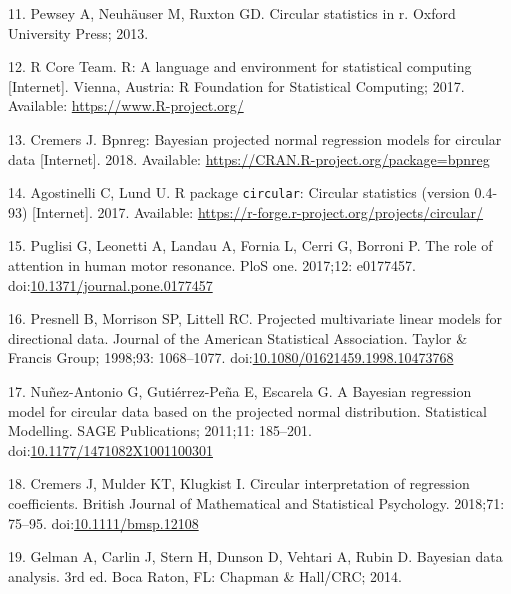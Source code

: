 \documentclass[11pt,]{article}
\begin{document}
\leavevmode\hypertarget{ref-pewsey2013circular}{}%
11. Pewsey A, Neuhäuser M, Ruxton GD. Circular statistics in r. Oxford
University Press; 2013.

\leavevmode\hypertarget{ref-team2017r}{}%
12. R Core Team. R: A language and environment for statistical computing
{[}Internet{]}. Vienna, Austria: R Foundation for Statistical Computing;
2017. Available: \url{https://www.R-project.org/}

\leavevmode\hypertarget{ref-bpnreg2018}{}%
13. Cremers J. Bpnreg: Bayesian projected normal regression models for
circular data {[}Internet{]}. 2018. Available:
\url{https://CRAN.R-project.org/package=bpnreg}

\leavevmode\hypertarget{ref-circularpackage}{}%
14. Agostinelli C, Lund U. R package \texttt{circular}: Circular
statistics (version 0.4-93) {[}Internet{]}. 2017. Available:
\url{https://r-forge.r-project.org/projects/circular/}

\leavevmode\hypertarget{ref-puglisi2017role}{}%
15. Puglisi G, Leonetti A, Landau A, Fornia L, Cerri G, Borroni P. The
role of attention in human motor resonance. PloS one. 2017;12: e0177457.
doi:\href{https://doi.org/10.1371/journal.pone.0177457}{10.1371/journal.pone.0177457}

\leavevmode\hypertarget{ref-presnell1998projected}{}%
16. Presnell B, Morrison SP, Littell RC. Projected multivariate linear
models for directional data. Journal of the American Statistical
Association. Taylor \& Francis Group; 1998;93: 1068--1077.
doi:\href{https://doi.org/10.1080/01621459.1998.10473768}{10.1080/01621459.1998.10473768}

\leavevmode\hypertarget{ref-nunez2011bayesian}{}%
17. Nuñez-Antonio G, Gutiérrez-Peña E, Escarela G. A Bayesian regression
model for circular data based on the projected normal distribution.
Statistical Modelling. SAGE Publications; 2011;11: 185--201.
doi:\href{https://doi.org/10.1177/1471082X1001100301}{10.1177/1471082X1001100301}

\leavevmode\hypertarget{ref-CremersMulderKlugkist2017}{}%
18. Cremers J, Mulder KT, Klugkist I. Circular interpretation of
regression coefficients. British Journal of Mathematical and Statistical
Psychology. 2018;71: 75--95.
doi:\href{https://doi.org/10.1111/bmsp.12108}{10.1111/bmsp.12108}

\leavevmode\hypertarget{ref-BDA}{}%
19. Gelman A, Carlin J, Stern H, Dunson D, Vehtari A, Rubin D. Bayesian
data analysis. 3rd ed. Boca Raton, FL: Chapman \& Hall/CRC; 2014.
\end{document}
